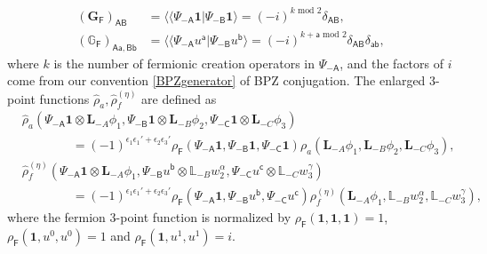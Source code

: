 \documentclass[12pt]{article}
\def\ie{\begin{equation}\begin{aligned}}
\def\fe{\end{aligned}\end{equation}}
\def\F{\mathsf{F}}
\begin{document}
\ie
(\mathbf{G}_{\F})_{\mathsf{A}\mathsf{B}} &= \langle \langle \Psi_{-\mathsf{A}}\mathbf{1}|\Psi_{-\mathsf{B}}\mathbf{1}\rangle = (-i)^{k\text{ mod }2} \delta_{\mathsf{AB}},\\
(\mathbb{G}_{\F})_{\mathsf{Aa},\mathsf{Bb}}&= \langle \langle \Psi_{-\mathsf{A}}u^{\mathsf{a}}|\Psi_{-\mathsf{B}}u^{\mathsf{b}}\rangle=(-i)^{k+\mathsf{a}\text{ mod }2}\delta_{\mathsf{AB}}\delta_{\mathsf{ab}},
\fe
where $k$ is the number of fermionic creation operators in $\Psi_{-\mathsf{A}}$, and the factors of $i$ come from our convention \eqref{BPZgenerator} of BPZ conjugation. The enlarged 3-point functions $\hat{\rho}_a, \hat{\rho}_f^{(\eta)}$ are defined as
\ie 
 &\hat\rho_a(\Psi_{-\mathsf A}\mathbf1\otimes\mathbf L_{-A}\phi_1,
 \Psi_{-\mathsf B}\mathbf1\otimes\mathbf L_{-B}\phi_2,
 \Psi_{-\mathsf C}\mathbf1\otimes\mathbf L_{-C}\phi_3)\\
 &\qquad\qquad=(-1)^{\epsilon_1\epsilon_1'+\epsilon_2 \epsilon_3'}
 \rho_{\mathsf{F}}(\Psi_{-\mathsf A}\mathbf1,\Psi_{-\mathsf B}\mathbf1,
                                      \Psi_{-\mathsf C}\mathbf1)
 \rho_a(\mathbf L_{-A}\phi_1,\mathbf L_{-B}\phi_2,\mathbf L_{-C}\phi_3),\\
 &\hat\rho_f^{(\eta)}(\Psi_{-\mathsf A}\mathbf1\otimes\mathbf L_{-A}\phi_1,
 \Psi_{-\mathsf B}u^{\mathsf b}\otimes\mathbb L_{-B}w_2^\alpha,
 \Psi_{-\mathsf C}u^{\mathsf c}\otimes\mathbb L_{-C}w_3^\gamma)\\
 &\qquad\qquad=(-1)^{\epsilon_1\epsilon_1'+\epsilon_2 \epsilon_3'}
 \rho_{\mathsf{F}}(\Psi_{-\mathsf A}\mathbf1,\Psi_{-\mathsf B}u^{\mathsf b},
                                      \Psi_{-\mathsf C}u^{\mathsf c})
 \rho_f^{(\eta)}(\mathbf L_{-A}\phi_1,\mathbb L_{-B}w_2^\alpha,
                                      \mathbb L_{-C}w_3^\gamma),
\fe
where the fermion 3-point function is normalized by $\rho_{\mathsf{F}}(\mathbf{1,1,1})=1$, $\rho_{\mathsf{F}}(\mathbf{1},u^0,u^0)=1$ and $\rho_{\mathsf{F}}(\mathbf{1},u^1,u^1)=i$.
\end{document}
